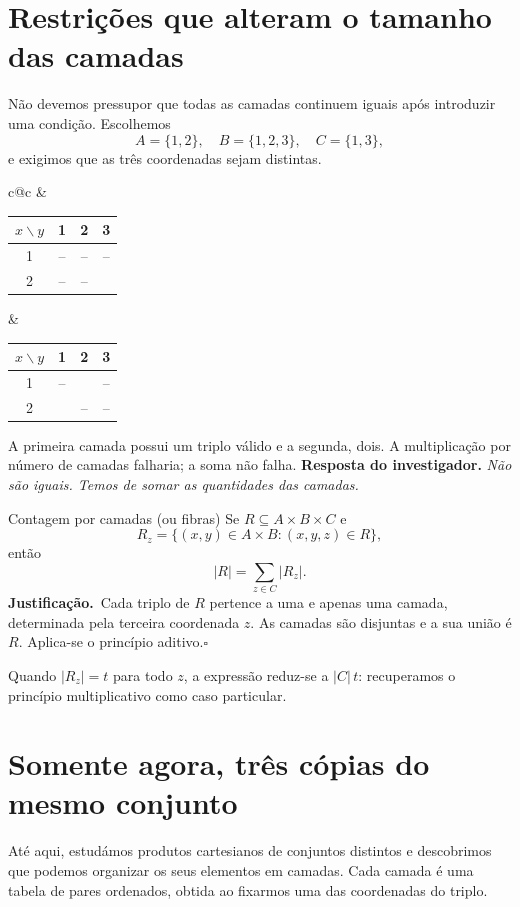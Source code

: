 \documentclass[11pt,a4paper,oneside]{book}
\newcommand{\Resposta}[1]{\textcolor{verdeescuro}{\textbf{Resposta do investigador.}} \emph{#1}\par}
\newcommand{\prova}{\textbf{Justificação.}\ }
\newcommand{\fimprova}{\hfill$\square$}
\newcommand{\card}[1]{\lvert #1\rvert}
\newcommand{\ccel}[1]{\cellcolor{green!13}{#1}}
\begin{document}
\section{Restrições que alteram o tamanho das camadas}
Não devemos pressupor que todas as camadas continuem iguais após introduzir uma condição. Escolhemos
\[A=\{1,2\},\quad B=\{1,2,3\},\quad C=\{1,3\},\]
e exigimos que as três coordenadas sejam distintas.
\begin{center}
\begin{tabular}{c@{\qquad\qquad}c}
&\\[2mm]
\begin{tabular}{c|ccc}$x\backslash y$&1&2&3\\\hline 1&--&--&--\\ 2&--&--&\ccel{$(2,3,1)$}\end{tabular}&
\begin{tabular}{c|ccc}$x\backslash y$&1&2&3\\\hline 1&--&\ccel{$(1,2,3)$}&--\\ 2&\ccel{$(2,1,3)$}&--&--\end{tabular}
\end{tabular}
\end{center}
A primeira camada possui um triplo válido e a segunda, dois. A multiplicação por número de camadas falharia; a soma não falha.
\Resposta{Não são iguais. Temos de somar as quantidades das camadas.}
\begin{teoremabox}{Contagem por camadas (ou fibras)}
Se $R\subseteq A\times B\times C$ e
\[R_z=\{(x,y)\in A\times B:(x,y,z)\in R\},\]
então
\[\boxed{\card R=\sum_{z\in C}\card{R_z}}.\]
\prova Cada triplo de $R$ pertence a uma e apenas uma camada, determinada pela terceira coordenada $z$. As camadas são disjuntas e a sua união é $R$. Aplica-se o princípio aditivo.\fimprova
\end{teoremabox}
Quando $\card{R_z}=t$ para todo $z$, a expressão reduz-se a $\card C\,t$: recuperamos o princípio multiplicativo como caso particular.


\section{Somente agora, três cópias do mesmo conjunto}

Até aqui, estudámos produtos cartesianos de conjuntos distintos
e descobrimos que podemos organizar os seus elementos em camadas.
Cada camada é uma tabela de pares ordenados, obtida ao fixarmos
uma das coordenadas do triplo.
\end{document}
